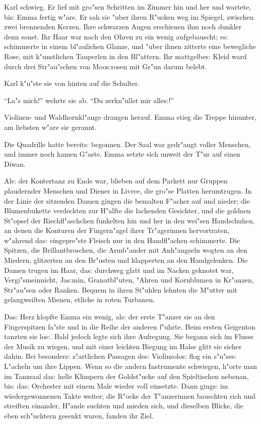\documentclass[oneside,12pt]{book}
\newcommand{\s}{s:}%
\begin{document}
Karl schwieg. Er lief mit gro"sen Schritten im Zimmer hin und her
und wartete, bi{\s} Emma fertig w"are. Er sah sie "uber ihren
R"ucken weg im Spiegel, zwischen zwei brennenden Kerzen. Ihre
schwarzen Augen erschienen ihm noch dunkler denn sonst. Ihr Haar
war nach den Ohren zu ein wenig aufgebauscht; e{\s} schimmerte in
einem bl"aulichen Glanze, und "uber ihnen zitterte eine bewegliche
Rose, mit k"unstlichen Tauperlen in den Bl"attern. Ihr
mattgelbe{\s} Kleid ward durch drei Str"au"schen von Moo{\s}rosen
mit Gr"un darum belebt.

Karl k"u"ste sie von hinten auf die Schulter.

"`La"s mich!"' wehrte sie ab. "`Du zerkn"ullst mir alle{\s}!"'

Violinen- und Waldhornkl"ange drangen herauf. Emma stieg die
Treppe hinunter, am liebsten w"are sie gerannt.

Die Quadrille hatte bereit{\s} begonnen. Der Saal war gedr"angt
voller Menschen, und immer noch kamen G"aste. Emma setzte sich
unweit der T"ur auf einen Diwan.

Al{\s} der Kontertanz zu Ende war, blieben auf dem Parkett nur
Gruppen plaudernder Menschen und Diener in Livree, die gro"se
Platten herumtrugen. In der Linie der sitzenden Damen gingen die
bemalten F"acher auf und nieder; die Blumenbukette verdeckten zur
H"alfte die lachenden Gesichter, und die goldnen St"opsel der
Riechfl"aschchen funkelten hin und her in den wei"sen Handschuhen,
an denen die Konturen der Fingern"agel ihrer Tr"agerinnen
hervortraten, w"ahrend da{\s} eingepre"ste Fleisch nur in den
Handfl"achen schimmerte. Die Spitzen, die Brillantbroschen, die
Armb"ander mit Anh"angseln wogten an den Miedern, glitzerten an
den Br"usten und klapperten an den Handgelenken. Die Damen trugen
im Haar, da{\s} durchweg glatt und im Nacken geknotet war,
Vergi"smeinnicht, Ja{\s}min, Granatbl"uten, "Ahren und Kornblumen
in Kr"anzen, Str"au"sen oder Ranken. Bequem in ihren St"uhlen
lehnten die M"utter mit gelangweilten Mienen, etliche in roten
Turbanen.

Da{\s} Herz klopfte Emma ein wenig, al{\s} der erste T"anzer sie
an den Fingerspitzen fa"ste und in die Reihe der anderen f"uhrte.
Beim ersten Geigenton tanzten sie lo{\s}. Bald jedoch legte sich
ihre Aufregung. Sie begann sich im Flusse der Musik zu wiegen, und
mit einer leichten Biegung im Halse glitt sie sicher dahin. Bei
besonder{\s} z"artlichen Passagen de{\s} Violinsolo{\s} flog ein
s"u"se{\s} L"acheln um ihre Lippen. Wenn so die andern Instrumente
schwiegen, h"orte man im Tanzsaal da{\s} helle Klimpern der
Goldst"ucke auf den Spieltischen nebenan, bi{\s} da{\s} Orchester
mit einem Male wieder voll einsetzte. Dann ging{\s} im
wiedergewonnenen Takte weiter; die R"ocke der T"anzerinnen
bauschten sich und streiften einander, H"ande suchten und mieden
sich, und dieselben Blicke, die eben sch"uchtern gesenkt waren,
fanden ihr Ziel.
\end{document}
